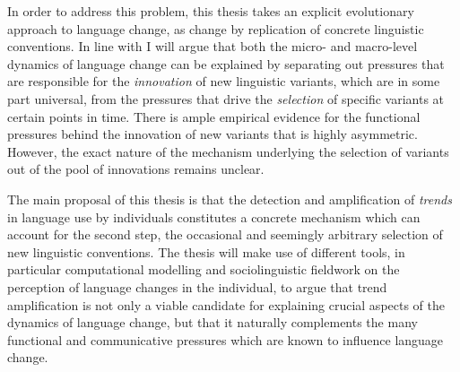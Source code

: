 
In order to address this problem, this thesis takes an explicit evolutionary approach to language change, as change by replication of concrete linguistic conventions.
In line with \citet{Croft2000} I will argue that both the micro- and macro-level dynamics of language change can be explained by separating out pressures that are responsible for the \emph{innovation} of new linguistic variants, which are in some part universal, from the pressures that drive the \emph{selection} of specific variants at certain points in time.
There is ample empirical evidence for the functional pressures behind the innovation of new variants that is highly asymmetric. However, the exact nature of the mechanism underlying the selection of variants out of the pool of innovations remains unclear.

The main proposal of this thesis is that the detection and amplification of \emph{trends} in language use by individuals constitutes a concrete mechanism which can account for the second step, the occasional and seemingly arbitrary selection of new linguistic conventions.
The thesis will make use of different tools, in particular computational modelling and sociolinguistic fieldwork on the perception of language changes in the individual, to argue that trend amplification is not only a viable candidate for explaining crucial aspects of the dynamics of language change, but that it naturally complements the many functional and communicative pressures which are known to influence language change. %

